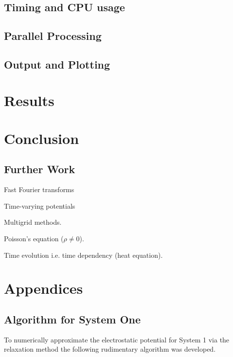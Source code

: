 \documentclass[12pt, a4paper]{article}
\begin{document}
\subsection{Timing and CPU usage}

\subsection{Parallel Processing}
%

\subsection{Output and Plotting}


\section{Results}
%

\section{Conclusion}

\subsection{Further Work}
Fast Fourier transforms

Time-varying potentials

Multigrid methods.

Poisson's equation ($\rho \neq 0$).

Time evolution i.e. time dependency (heat equation).



\appendix
\section{Appendices}
\subsection{Algorithm for System One}
To numerically approximate the electrostatic potential for System 1 via the 
relaxation method the following rudimentary algorithm was developed.
\end{document}
